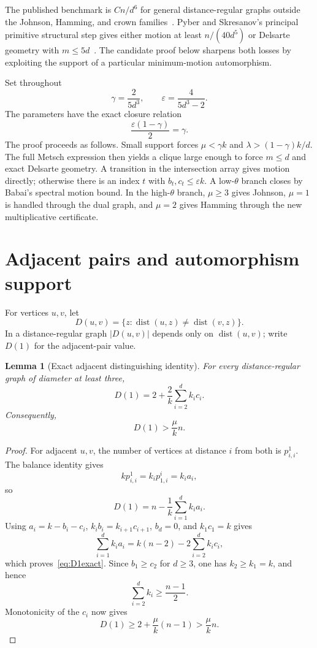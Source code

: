 \documentclass[11pt]{amsart}
\newtheorem{lemma}[theorem]{Lemma}
\theoremstyle{definition}
\newcommand{\dist}{\operatorname{dist}}
\newcommand{\eps}{\varepsilon}
\newcommand{\gam}{\gamma}
\begin{document}
The published benchmark is $Cn/d^6$ for general distance-regular graphs outside the Johnson, Hamming, and crown families~\cite[Theorem 1.4]{PS}.  Pyber and Skresanov's principal primitive structural step gives either motion at least $n/(40d^5)$ or Delsarte geometry with $m\le5d$~\cite[Theorem 1.7]{PS}.  The candidate proof below sharpens both losses by exploiting the support of a particular minimum-motion automorphism.

Set throughout
\begin{equation}\label{eq:parameters}
 \gam=\frac{2}{5d^3},\qquad
 \eps=\frac{4}{5d^3-2}.
\end{equation}
The parameters have the exact closure relation
\begin{equation}\label{eq:closure}
 \frac{\eps(1-\gam)}2=\gam.
\end{equation}
The proof proceeds as follows.  Small support forces $\mu<\gam k$ and $\lambda>(1-\gam)k/d$.  The full Metsch expression then yields a clique large enough to force $m\le d$ and exact Delsarte geometry.  A transition in the intersection array gives motion directly; otherwise there is an index $t$ with $b_t,c_t\le\eps k$.  A low-$\theta$ branch closes by Babai's spectral motion bound.  In the high-$\theta$ branch, $\mu\ge3$ gives Johnson, $\mu=1$ is handled through the dual graph, and $\mu=2$ gives Hamming through the new multiplicative certificate.

\section{Adjacent pairs and automorphism support}
For vertices $u,v$, let
\[
 D(u,v)=\{z:\dist(u,z)\ne\dist(v,z)\}.
\]
In a distance-regular graph $|D(u,v)|$ depends only on $\dist(u,v)$; write $D(1)$ for the adjacent-pair value.

\begin{lemma}[Exact adjacent distinguishing identity]\label{lem:D1}
For every distance-regular graph of diameter at least three,
\begin{equation}\label{eq:D1exact}
 D(1)=2+\frac2k\sum_{i=2}^{d}k_i c_i.
\end{equation}
Consequently,
\begin{equation}\label{eq:D1mu}
 D(1)>\frac{\mu}{k}n.
\end{equation}
\end{lemma}

\begin{proof}
For adjacent $u,v$, the number of vertices at distance $i$ from both is $p^1_{i,i}$.  The balance identity gives
\[
 kp^1_{i,i}=k_i p^i_{1,i}=k_i a_i,
\]
so
\[
 D(1)=n-\frac1k\sum_{i=1}^{d}k_i a_i.
\]
Using $a_i=k-b_i-c_i$, $k_i b_i=k_{i+1}c_{i+1}$, $b_d=0$, and $k_1c_1=k$ gives
\[
 \sum_{i=1}^{d}k_i a_i=k(n-2)-2\sum_{i=2}^{d}k_i c_i,
\]
which proves~\eqref{eq:D1exact}.  Since $b_1\ge c_2$ for $d\ge3$, one has $k_2\ge k_1=k$, and hence
\[
 \sum_{i=2}^{d}k_i\ge\frac{n-1}{2}.
\]
Monotonicity of the $c_i$ now gives
\[
 D(1)\ge2+\frac{\mu}{k}(n-1)>\frac{\mu}{k}n.
\]
\end{proof}
\end{document}
